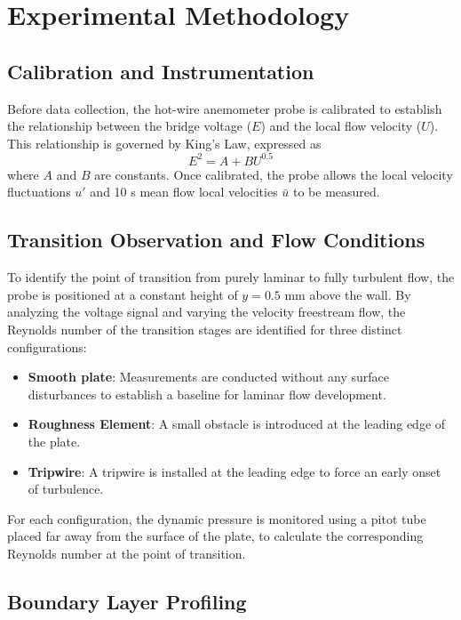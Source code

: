 \documentclass{article}
\begin{document}
\section{Experimental Methodology}

\subsection{Calibration and Instrumentation}

Before data collection, the hot-wire anemometer probe is calibrated to establish the relationship between the bridge voltage ($E$) and the local flow velocity ($U$). This relationship is governed by King’s Law, expressed as
\begin{equation*}
    E^2 = A + BU^{0.5}
\end{equation*}
where $A$ and $B$ are constants. Once calibrated, the probe allows the local velocity fluctuations $u'$ and 10 \unit{\second} mean flow local velocities $\bar{u}$ to be measured.

\subsection{Transition Observation and Flow Conditions}

To identify the point of transition from purely laminar to fully turbulent flow, the probe is positioned at a constant height of $y=0.5$ \unit{\mm} above the wall. By analyzing the voltage signal and varying the velocity freestream flow, the Reynolds number of the transition stages are identified for three distinct configurations:
\begin{itemize}[itemsep=0.1pt]
    \vspace{-6pt}
    \item \textbf{Smooth plate}: Measurements are conducted without any surface disturbances to establish a baseline for laminar flow development.
    \item \textbf{Roughness Element}: A small obstacle is introduced at the leading edge of the plate.
    \item \textbf{Tripwire}: A tripwire is installed at the leading edge to force an early onset of turbulence.
\end{itemize}
For each configuration, the dynamic pressure is monitored using a pitot tube placed far away from the surface of the plate, to calculate the corresponding Reynolds number at the point of transition.

\subsection{Boundary Layer Profiling}
\end{document}
